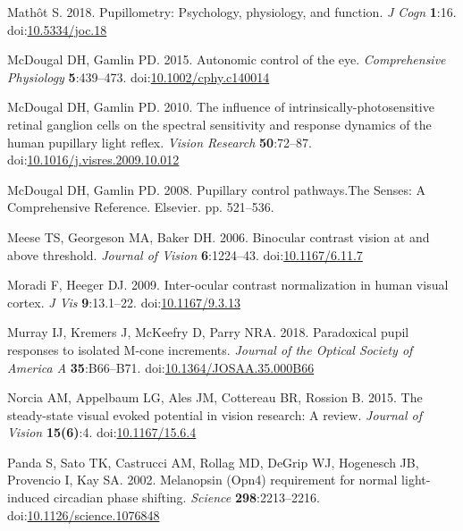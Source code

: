\documentclass[
]{article}
\newlength{\cslhangindent}
\newlength{\cslentryspacingunit} %
\newenvironment{CSLReferences}[2] %
 {%
  \setlength{\parindent}{0pt}
  \ifodd #1
  \let\oldpar\par
  \def\par{\hangindent=\cslhangindent\oldpar}
  \fi
  \setlength{\parskip}{#2\cslentryspacingunit}
 }%
 {}
\begin{document}
\begin{CSLReferences}{1}{0}
\leavevmode{}%
Mathôt S. 2018. Pupillometry: Psychology, physiology, and function. \emph{J Cogn} \textbf{1}:16. doi:\href{https://doi.org/10.5334/joc.18}{10.5334/joc.18}

\leavevmode{}%
McDougal DH, Gamlin PD. 2015. Autonomic control of the eye. \emph{Comprehensive Physiology} \textbf{5}:439--473. doi:\href{https://doi.org/10.1002/cphy.c140014}{10.1002/cphy.c140014}

\leavevmode{}%
McDougal DH, Gamlin PD. 2010. The influence of intrinsically-photosensitive retinal ganglion cells on the spectral sensitivity and response dynamics of the human pupillary light reflex. \emph{Vision Research} \textbf{50}:72--87. doi:\href{https://doi.org/10.1016/j.visres.2009.10.012}{10.1016/j.visres.2009.10.012}

\leavevmode{}%
McDougal DH, Gamlin PD. 2008. Pupillary control pathways.The Senses: A Comprehensive Reference. Elsevier. pp. 521--536.

\leavevmode{}%
Meese TS, Georgeson MA, Baker DH. 2006. Binocular contrast vision at and above threshold. \emph{Journal of Vision} \textbf{6}:1224--43. doi:\href{https://doi.org/10.1167/6.11.7}{10.1167/6.11.7}

\leavevmode{}%
Moradi F, Heeger DJ. 2009. Inter-ocular contrast normalization in human visual cortex. \emph{J Vis} \textbf{9}:13.1--22. doi:\href{https://doi.org/10.1167/9.3.13}{10.1167/9.3.13}

\leavevmode{}%
Murray IJ, Kremers J, McKeefry D, Parry NRA. 2018. Paradoxical pupil responses to isolated {M}-cone increments. \emph{Journal of the Optical Society of America A} \textbf{35}:B66--B71. doi:\href{https://doi.org/10.1364/JOSAA.35.000B66}{10.1364/JOSAA.35.000B66}

\leavevmode{}%
Norcia AM, Appelbaum LG, Ales JM, Cottereau BR, Rossion B. 2015. The steady-state visual evoked potential in vision research: A review. \emph{Journal of Vision} \textbf{15(6)}:4. doi:\href{https://doi.org/10.1167/15.6.4}{10.1167/15.6.4}

\leavevmode{}%
Panda S, Sato TK, Castrucci AM, Rollag MD, DeGrip WJ, Hogenesch JB, Provencio I, Kay SA. 2002. Melanopsin (Opn4) requirement for normal light-induced circadian phase shifting. \emph{Science} \textbf{298}:2213--2216. doi:\href{https://doi.org/10.1126/science.1076848}{10.1126/science.1076848}


\end{CSLReferences}
\end{document}
